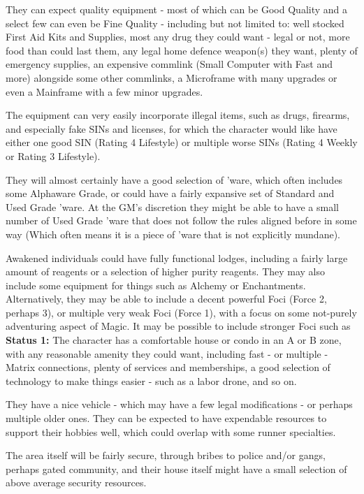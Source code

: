 \begin{multicols*}{2}
	They can expect quality equipment - most of which can be Good Quality and a select few can even be Fine Quality - including but not limited to: well stocked First Aid Kits and Supplies, most any drug they could want - legal or not, more food than could last them, any legal home defence weapon(s) they want, plenty of emergency supplies, an expensive commlink (Small Computer with Fast and more) alongside some other commlinks, a Microframe with many upgrades or even a Mainframe with a few minor upgrades. 
	
	The equipment can very easily incorporate illegal items, such as drugs, firearms, and especially fake SINs and licenses, for which the character would like have either one good SIN (Rating 4 Lifestyle) or multiple worse SINs (Rating 4 Weekly or Rating 3 Lifestyle).
	
	They will almost certainly have a good selection of 'ware, which often includes some Alphaware Grade, or could have a fairly expansive set of Standard and Used Grade 'ware. At the GM's discretion they might be able to have a small number of Used Grade 'ware that does not follow the rules aligned before in some way (Which often means it is a piece of 'ware that is not explicitly mundane).
	
	Awakened individuals could have fully functional lodges, including a fairly large amount of reagents or a selection of higher purity reagents. They may also include some equipment for things such as Alchemy or Enchantments. Alternatively, they may be able to include a decent powerful Foci (Force 2, perhaps 3), or multiple very weak Foci (Force 1), with a focus on some not-purely adventuring aspect of Magic. It may be possible to include stronger Foci such as\\
	
	\textbf{Status 1:} The character has a comfortable house or condo in an A or B zone, with any reasonable amenity they could want, including fast - or multiple - Matrix connections, plenty of services and memberships, a good selection of technology to make things easier - such as a labor drone, and so on. 
	
	They have a nice vehicle - which may have a few legal modifications - or perhaps multiple older ones. They can be expected to have expendable resources to support their hobbies well, which could overlap with some runner specialties. 
	
	The area itself will be fairly secure, through bribes to police and/or gangs, perhaps gated community, and their house itself might have a small selection of above average security resources. 
	

\end{multicols*}
